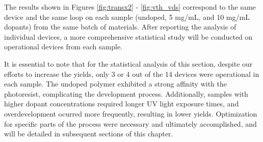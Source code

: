 


The results shown in Figures \ref{fig:transx2} - \ref{fig:vth_vds} correspond to the same device and the same loop on each sample (undoped, 5 mg/mL, and 10 mg/mL dopants) from the same batch of materials. After reporting the analysis of individual devices, a more comprehensive statistical study will be conducted on operational devices from each sample. 

It is essential to note that for the statistical analysis of this section, despite our efforts to increase the yields, only 3 or 4 out of the 14 devices were operational in each sample. The undoped polymer exhibited a strong affinity with the photoresist, complicating the development process. Additionally, samples with higher dopant concentrations required longer UV light exposure times, and overdevelopment ocurred more frequently, resulting in lower yields. Optimization for specific parts of the process were necessary and ultimately accomplished, and will be detailed in subsequent sections of this chapter. 

